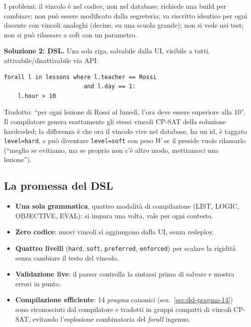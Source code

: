 I problemi: il vincolo \`e nel codice, non nel database; richiede
una build per cambiare; non pu\`o essere modificato dalla
segreteria; va riscritto identico per ogni docente con vincoli
analoghi (decine, su una scuola grande); non si vede nei test;
non si pu\`o rilassare a soft con un parametro.

\textbf{Soluzione 2: DSL.} Una sola riga, salvabile dalla UI,
visibile a tutti, attivabile/disattivabile via API:

\begin{lstlisting}[basicstyle=\ttfamily\small]
forall l in lessons where l.teacher == Rossi
                       and l.day == 1:
    l.hour > 10
\end{lstlisting}

Tradotto: ``per ogni lezione di Rossi al luned\`i, l'ora deve
essere superiore alla 10''.\,Il compilatore genera esattamente
gli stessi vincoli CP-SAT della soluzione hardcoded; la
differenza \`e che ora il vincolo vive nel database, ha un id,
\`e taggato \texttt{level=hard}, e pu\`o diventare
\texttt{level=soft} con peso $W$ se il preside vuole rilassarlo
(``meglio se evitiamo, ma se proprio non c'\`e altro modo,
mettiamoci una lezione'').

\subsection*{La promessa del DSL}

\begin{itemize}
\item \textbf{Una sola grammatica}, quattro modalit\`a di
  compilazione (LIST, LOGIC, OBJECTIVE, EVAL): si impara una
  volta, vale per ogni contesto.
\item \textbf{Zero codice}: nuovi vincoli si aggiungono dalla
  UI, senza redeploy.
\item \textbf{Quattro livelli} (\texttt{hard}, \texttt{soft},
  \texttt{preferred}, \texttt{enforced}) per scalare la
  rigidit\`a senza cambiare il testo del vincolo.
\item \textbf{Validazione live}: il parser controlla la
  sintassi prima di salvare e mostra errori in punto.
\item \textbf{Compilazione efficiente}: 14 \emph{pragma}
  canonici (sez.~\ref{sec:dsl-pragma-14}) sono riconosciuti dal
  compilatore e tradotti in gruppi compatti di vincoli CP-SAT,
  evitando l'esplosione combinatoria del \emph{forall} ingenuo.
\end{itemize}

